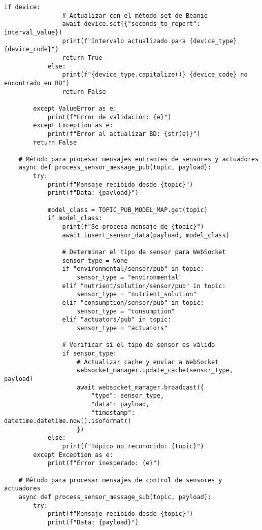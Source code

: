 \begin{lstlisting}[label=cod:mqtt_connection,caption=Definición de Clase para cliente MQTT., language=PythonUTF8]
            if device:
                # Actualizar con el método set de Beanie
                await device.set({"seconds_to_report": interval_value})       
                print(f"Intervalo actualizado para {device_type} {device_code}")
                return True
            else:
                print(f"{device_type.capitalize()} {device_code} no encontrado en BD")
                return False
                
        except ValueError as e:
            print(f"Error de validación: {e}")
        except Exception as e:
            print(f"Error al actualizar BD: {str(e)}")
        return False
            
    # Método para procesar mensajes entrantes de sensores y actuadores
    async def process_sensor_message_pub(topic, payload):
        try:
            print(f"Mensaje recibido desde {topic}")
            print(f"Data: {payload}")

            model_class = TOPIC_PUB_MODEL_MAP.get(topic)
            if model_class:
                print(f"Se procesa mensaje de {topic}")
                await insert_sensor_data(payload, model_class)
                
                # Determinar el tipo de sensor para WebSocket
                sensor_type = None
                if "environmental/sensor/pub" in topic:
                    sensor_type = "environmental"
                elif "nutrient/solution/sensor/pub" in topic:
                    sensor_type = "nutrient_solution"
                elif "consumption/sensor/pub" in topic:
                    sensor_type = "consumption"
                elif "actuators/pub" in topic:
                    sensor_type = "actuators"
                
                # Verificar si el tipo de sensor es válido
                if sensor_type:
                    # Actualizar cache y enviar a WebSocket
                    websocket_manager.update_cache(sensor_type, payload)
                    await websocket_manager.broadcast({
                        "type": sensor_type,
                        "data": payload,
                        "timestamp": datetime.datetime.now().isoformat()
                    })
            else:
                print(f"Tópico no reconocido: {topic}")
        except Exception as e:
            print(f"Error inesperado: {e}")

    # Método para procesar mensajes de control de sensores y actuadores
    async def process_sensor_message_sub(topic, payload):
        try:
            print(f"Mensaje recibido desde {topic}")
            print(f"Data: {payload}")


\end{lstlisting}
